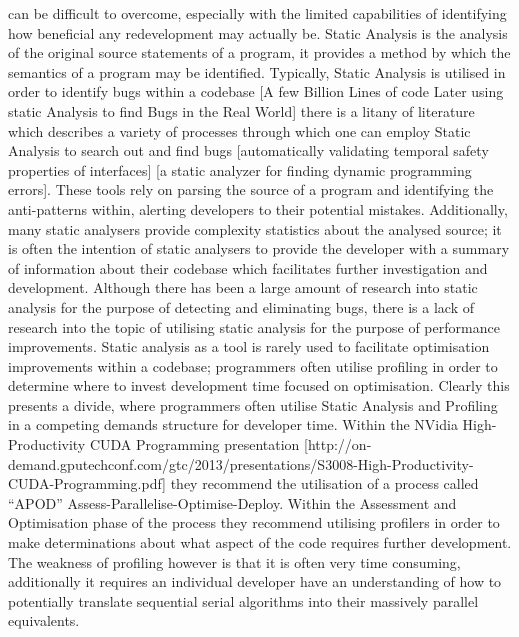 can be difficult to overcome, especially with the limited capabilities of identifying how beneficial any redevelopment may actually be.
Static Analysis is the analysis of the original source statements of a program, it provides a method by which the semantics of a program may be identified. Typically, Static Analysis is utilised in order to identify bugs within a codebase [A few Billion Lines of code Later using static Analysis to find Bugs in the Real World] there is a litany of literature which describes a variety of processes through which one can employ Static Analysis to search out and find bugs [automatically validating temporal safety properties of interfaces]  [a static analyzer for finding dynamic programming errors]. These tools rely on parsing the source of a program and identifying the anti-patterns within, alerting developers to their potential mistakes. Additionally, many static analysers provide complexity statistics about the analysed source; it is often the intention of static analysers to provide the developer with a summary of information about their codebase which facilitates further investigation and development. Although there has been a large amount of research into static analysis for the purpose of detecting and eliminating bugs, there is a lack of research into the topic of utilising static analysis for the purpose of performance improvements. Static analysis as a tool is rarely used to facilitate optimisation improvements within a codebase; programmers often utilise profiling in order to determine where to invest development time focused on optimisation. Clearly this presents a divide, where programmers often utilise Static Analysis and Profiling in a competing demands structure for developer time. Within the NVidia High-Productivity CUDA Programming presentation [http://on-demand.gputechconf.com/gtc/2013/presentations/S3008-High-Productivity-CUDA-Programming.pdf] they recommend the utilisation of a process called “APOD” Assess-Parallelise-Optimise-Deploy. Within the Assessment and Optimisation phase of the process they recommend utilising profilers in order to make determinations about what aspect of the code requires further development. The weakness of profiling however is that it is often very time consuming, additionally it requires an individual developer have an understanding of how to potentially translate sequential serial algorithms into their massively parallel equivalents. 
 

